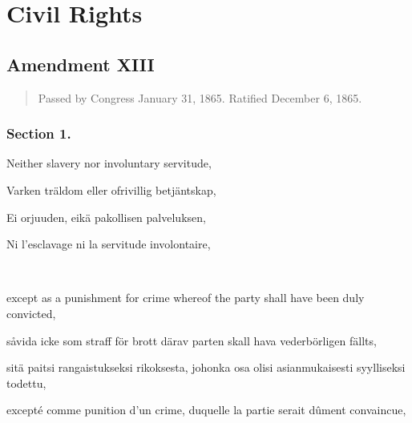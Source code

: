\documentclass[a4paper,landscape,12pt]{article}
\begin{document}
\section*{Civil Rights}
\subsection*{Amendment XIII}
\begin{quote}\small
	Passed by Congress January 31, 1865. Ratified December 6, 1865.
\end{quote}
\subsubsection*{Section 1.}
\begin{minipage}[t]{0.22\textwidth}
Neither slavery nor involuntary servitude,
\end{minipage}\textwidth
\begin{minipage}[t]{0.22\textwidth}
Varken träldom eller ofrivillig betjäntskap,
\end{minipage}\textwidth
\begin{minipage}[t]{0.22\textwidth}
Ei orjuuden, eikä pakollisen palveluksen,
\end{minipage}\textwidth
\begin{minipage}[t]{0.22\textwidth}
Ni l'esclavage ni la servitude involontaire,
\end{minipage}

~

\begin{minipage}[t]{0.22\textwidth}
except as a punishment for crime whereof the party shall have been duly convicted,
\end{minipage}\textwidth
\begin{minipage}[t]{0.22\textwidth}
 såvida icke som straff för brott därav parten skall hava vederbörligen fällts, 
\end{minipage}\textwidth
\begin{minipage}[t]{0.22\textwidth}
 sitä paitsi rangaistukseksi rikoksesta, johonka osa olisi asianmukaisesti syylliseksi todettu,
\end{minipage}\textwidth
\begin{minipage}[t]{0.22\textwidth}
excepté comme punition d'un crime, duquelle la partie serait dûment convaincue,
\end{minipage}
\end{document}
